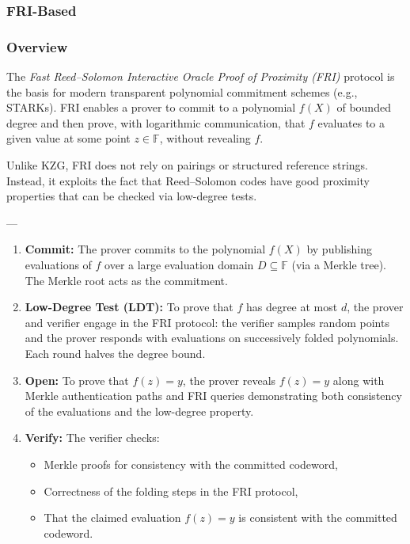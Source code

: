\subsubsection{FRI-Based}

\subsubsection*{Overview}

The \emph{Fast Reed–Solomon Interactive Oracle Proof of Proximity (FRI)} protocol is the basis for modern transparent polynomial commitment schemes (e.g., STARKs).  
FRI enables a prover to commit to a polynomial $f(X)$ of bounded degree and then prove, with logarithmic communication, that $f$ evaluates to a given value at some point $z \in \mathbb{F}$, without revealing $f$.  

Unlike KZG, FRI does not rely on pairings or structured reference strings. Instead, it exploits the fact that Reed–Solomon codes have good proximity properties that can be checked via low-degree tests.  

---

\begin{protocol}
\begin{enumerate}
  \item \textbf{Commit:}  
  The prover commits to the polynomial $f(X)$ by publishing evaluations of $f$ over a large evaluation domain $D \subseteq \mathbb{F}$ (via a Merkle tree).  
  The Merkle root acts as the commitment.

  \item \textbf{Low-Degree Test (LDT):}  
  To prove that $f$ has degree at most $d$, the prover and verifier engage in the FRI protocol:  
  the verifier samples random points and the prover responds with evaluations on successively folded polynomials.  
  Each round halves the degree bound.

  \item \textbf{Open:}  
  To prove that $f(z) = y$, the prover reveals $f(z) = y$ along with Merkle authentication paths and FRI queries demonstrating both consistency of the evaluations and the low-degree property.

  \item \textbf{Verify:}  
  The verifier checks:
  \begin{itemize}
    \item Merkle proofs for consistency with the committed codeword,  
    \item Correctness of the folding steps in the FRI protocol,  
    \item That the claimed evaluation $f(z) = y$ is consistent with the committed codeword.  
  \end{itemize}
\end{enumerate}
\end{protocol}

